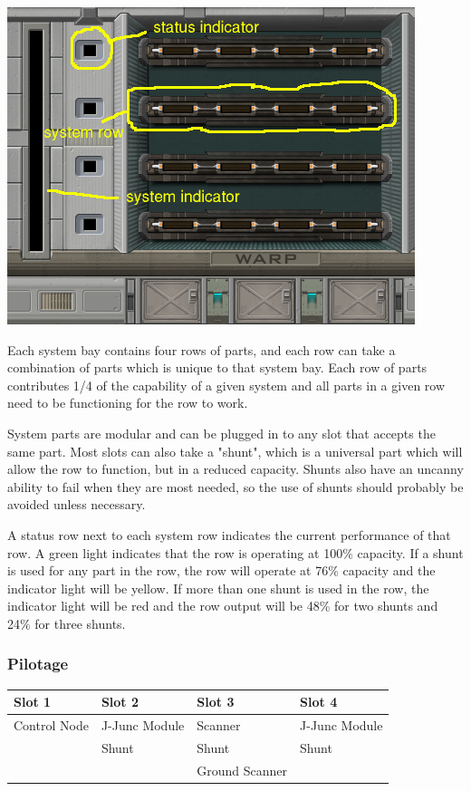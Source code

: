 \includegraphics[scale=0.70]{images/interior-warp.png}

Each system bay contains four rows of parts, and each row can take a
combination of parts which is unique to that system bay.  Each row of
parts contributes 1/4 of the capability of a given system and all parts
in a given row need to be functioning for the row to work.

System parts are modular and can be plugged in to any slot that accepts the
same part.  Most slots can also take a "shunt", which is a universal part
which will allow the row to function, but in a reduced capacity.  Shunts
also have an uncanny ability to fail when they are most needed, so the use
of shunts should probably be avoided unless necessary.

A status row next to each system row indicates the current performance
of that row.  A green light indicates that the row is operating at
100\% capacity.  If a shunt is used for any part in the row, the row will
operate at 76\% capacity and the indicator light will be yellow.  If
more than one shunt is used in the row, the indicator light will be red
and the row output will be 48\% for two shunts and 24\% for three shunts.

\subsubsection{Pilotage}

\begin{tabular}{ | p{2.5cm} | p{2.5cm} | p{2.5cm} | p{2.5cm} | }
\hline
Slot 1 & Slot 2 & Slot 3 & Slot 4 \\ \hline
Control Node & J-Junc Module & Scanner & J-Junc Module \\
& Shunt & Shunt & Shunt \\
& & Ground Scanner & \\
\hline
\end{tabular}

